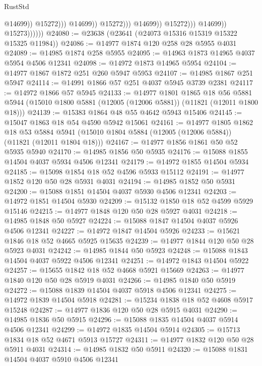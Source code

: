 \begin{lexlean}{RustStd}
\begin{coremodule}
                                                  @14699))
                                              @15272)))
                                        @14699))
                                    @15272)))
                              @14699))
                          @15272)))
                    @14699))
                @15273))))))
@24080 := @23638 (@23641 (@24073 @15316 @15319 @15322 @15325 @11984))
@24086 := @14977 @1874 @120 @258 @28 @5955 @4031
@24089 := @14985 @1874 @258 @5955
@24095 := @14963 @1873 @14965 @4037 @5954 @4506 @12341
@24098 := @14972 @1873 @14965 @5954
@24104 := @14977 @1867 @1872 @251 @260 @5947 @5953
@24107 := @14985 @1867 @251 @5947
@24114 := @14991 @1866 @57 @251 @4037 @5945 @3739 @2381
@24117 := @14972 @1866 @57 @5945
@24133 := @14977
    @1801
    @1865
    @18
    @56
    @5881
    @5944
    (@15010 @1800 @5881 (@12005 (@12006 @5881)) (@11821 (@12011 @1800 @18)))
@24139 := @15383 @1864 @48 @55 @4642 @5943 @15406
@24145 := @15047 @1863 @18 @54 @4590 @5942 @15061
@24161 := @14977
    @1805
    @1862
    @18
    @53
    @5884
    @5941
    (@15010 @1804 @5884 (@12005 (@12006 @5884)) (@11821 (@12011 @1804 @18)))
@24167 := @14977 @1856 @1861 @50 @52 @5935 @5940
@24170 := @14985 @1856 @50 @5935
@24176 := @15088 @1855 @14504 @4037 @5934 @4506 @12341
@24179 := @14972 @1855 @14504 @5934
@24185 := @15098 @1854 @18 @52 @4596 @5933 @15112
@24191 := @14977 @1852 @120 @50 @28 @5931 @4031
@24194 := @14985 @1852 @50 @5931
@24200 := @15088 @1851 @14504 @4037 @5930 @4506 @12341
@24203 := @14972 @1851 @14504 @5930
@24209 := @15132 @1850 @18 @52 @4599 @5929 @15146
@24215 := @14977 @1848 @120 @50 @28 @5927 @4031
@24218 := @14985 @1848 @50 @5927
@24224 := @15088 @1847 @14504 @4037 @5926 @4506 @12341
@24227 := @14972 @1847 @14504 @5926
@24233 := @15621 @1846 @18 @52 @4665 @5925 @15635
@24239 := @14977 @1844 @120 @50 @28 @5923 @4031
@24242 := @14985 @1844 @50 @5923
@24248 := @15088 @1843 @14504 @4037 @5922 @4506 @12341
@24251 := @14972 @1843 @14504 @5922
@24257 := @15655 @1842 @18 @52 @4668 @5921 @15669
@24263 := @14977 @1840 @120 @50 @28 @5919 @4031
@24266 := @14985 @1840 @50 @5919
@24272 := @15088 @1839 @14504 @4037 @5918 @4506 @12341
@24275 := @14972 @1839 @14504 @5918
@24281 := @15234 @1838 @18 @52 @4608 @5917 @15248
@24287 := @14977 @1836 @120 @50 @28 @5915 @4031
@24290 := @14985 @1836 @50 @5915
@24296 := @15088 @1835 @14504 @4037 @5914 @4506 @12341
@24299 := @14972 @1835 @14504 @5914
@24305 := @15713 @1834 @18 @52 @4671 @5913 @15727
@24311 := @14977 @1832 @120 @50 @28 @5911 @4031
@24314 := @14985 @1832 @50 @5911
@24320 := @15088 @1831 @14504 @4037 @5910 @4506 @12341

\end{coremodule}
\end{lexlean}
